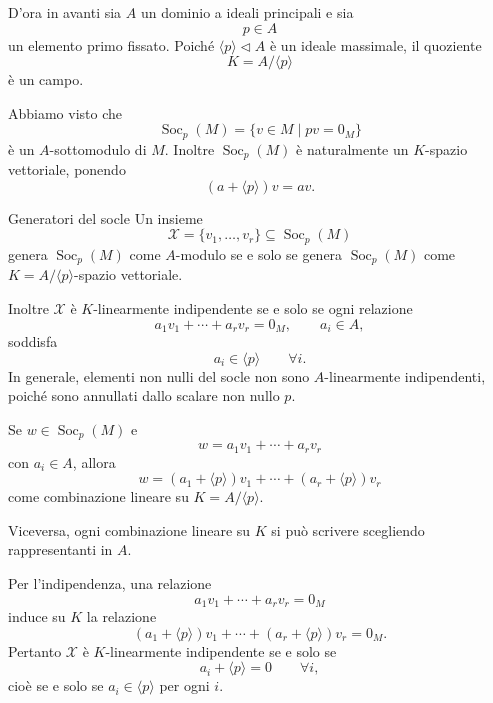 \documentclass[a4paper]{article}
\begin{document}
\begin{radioactive}
D'ora in avanti sia \(A\) un dominio a ideali principali e sia
\[
    p\in A
\]
un elemento primo fissato. Poiché \(\langle p \rangle\triangleleft A\) è un ideale massimale, il quoziente
\[
    K=A/\langle p \rangle
\]
è un campo.

Abbiamo visto che
\[
    \operatorname{Soc}_p(M)
    =
    \{v\in M\mid pv=0_M\}
\]
è un \(A\)-sottomodulo di \(M\). Inoltre \(\operatorname{Soc}_p(M)\) è naturalmente un \(K\)-spazio vettoriale, ponendo
\[
    (a+\langle p \rangle)v=av.
\]
\end{radioactive}

\begin{radioactive}
\begin{snippetremark}{Generatori del socle}
    Un insieme
    \[
        \mathcal{X}=\{v_1,\ldots,v_r\}\subseteq \operatorname{Soc}_p(M)
    \]
    genera \(\operatorname{Soc}_p(M)\) come \(A\)-modulo se e solo se genera \(\operatorname{Soc}_p(M)\) come \(K=A/\langle p \rangle\)-spazio vettoriale.

    Inoltre \(\mathcal{X}\) è \(K\)-linearmente indipendente se e solo se ogni relazione
    \[
        a_1v_1+\cdots+a_rv_r=0_M,
        \qquad
        a_i\in A,
    \]
    soddisfa
    \[
        a_i\in\langle p\rangle
        \qquad
        \forall i.
    \]
    In generale, elementi non nulli del socle non sono \(A\)-linearmente indipendenti, poiché sono annullati dallo scalare non nullo \(p\).
\end{snippetremark}
\end{radioactive}

\begin{radioactive}
\begin{snippetproof}{}
    Se \(w\in \operatorname{Soc}_p(M)\) e
    \[
        w=a_1v_1+\cdots+a_rv_r
    \]
    con \(a_i\in A\), allora
    \[
        w=(a_1+\langle p \rangle)v_1+\cdots+(a_r+\langle p \rangle)v_r
    \]
    come combinazione lineare su \(K=A/\langle p \rangle\).

    Viceversa, ogni combinazione lineare su \(K\) si può scrivere scegliendo rappresentanti in \(A\).

    Per l'indipendenza, una relazione
    \[
        a_1v_1+\cdots+a_rv_r=0_M
    \]
    induce su \(K\) la relazione
    \[
        (a_1+\langle p \rangle)v_1+\cdots+(a_r+\langle p \rangle)v_r=0_M.
    \]
    Pertanto \(\mathcal{X}\) è \(K\)-linearmente indipendente se e solo se
    \[
        a_i+\langle p \rangle=0
        \qquad
        \forall i,
    \]
    cioè se e solo se \(a_i\in\langle p\rangle\) per ogni \(i\).
\end{snippetproof}
\end{radioactive}
\end{document}
